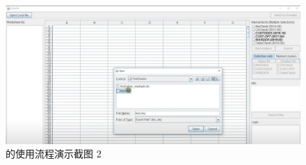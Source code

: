 \begin{figure}[tbp]    
    \centering
    \includegraphics[width=\textwidth]{figure/sg/sguard-2.png}
    \caption{\sg 的使用流程演示截图 2}
    \label{figure-sg2}
\end{figure}